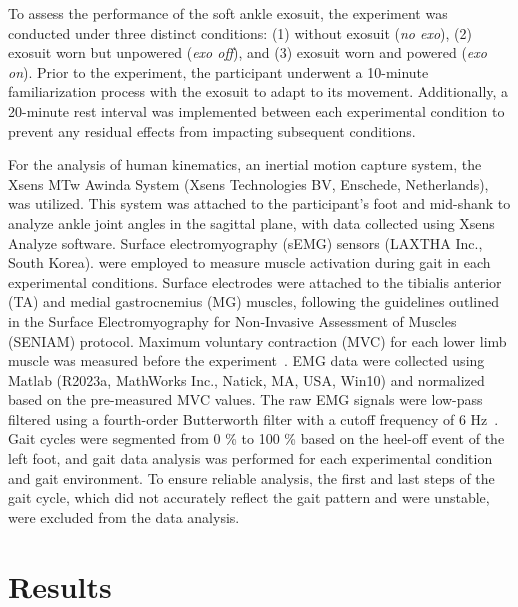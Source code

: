 \documentclass[journal,article,submit,pdftex,moreauthors]{Definitions/mdpi}
\begin{document}
To assess the performance of the soft ankle exosuit, the experiment was conducted under three distinct conditions: (1) without exosuit (\textit{no exo}), (2) exosuit worn but unpowered (\textit{exo off}), and (3) exosuit worn and powered (\textit{exo on}). Prior to the experiment, the participant underwent a 10-minute familiarization process with the exosuit to adapt to its movement. Additionally, a 20-minute rest interval was implemented between each experimental condition to prevent any residual effects from impacting subsequent conditions.

For the analysis of human kinematics, an inertial motion capture system, the Xsens MTw Awinda System (Xsens Technologies BV, Enschede, Netherlands), was utilized. This system was attached to the participant's foot and mid-shank to analyze ankle joint angles in the sagittal plane, with data collected using Xsens Analyze software.
Surface electromyography (sEMG) sensors (LAXTHA Inc., South Korea). were employed to measure muscle activation during gait in each experimental conditions. Surface electrodes were attached to the tibialis anterior (TA) and medial gastrocnemius (MG) muscles, following the guidelines outlined in the Surface Electromyography for Non-Invasive Assessment of Muscles (SENIAM) protocol. Maximum voluntary contraction (MVC) for each lower limb muscle was measured before the experiment~\cite{Allison1993,Burden2010}. EMG data were collected using Matlab (R2023a, MathWorks Inc., Natick, MA, USA, Win10) and normalized based on the pre-measured MVC values. The raw EMG signals were low-pass filtered using a fourth-order Butterworth filter with a cutoff frequency of 6 Hz~\cite{Roger2007}.
Gait cycles were segmented from 0 \% to 100 \% based on the heel-off event of the left foot, and gait data analysis was performed for each experimental condition and gait environment. To ensure reliable analysis, the first and last steps of the gait cycle, which did not accurately reflect the gait pattern and were unstable, were excluded from the data analysis.

\section{Results}
\end{document}
